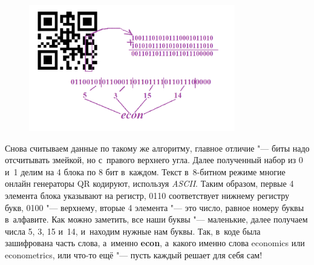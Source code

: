 \documentclass[final,pdftex]{../../template/epsilonj}
\begin{document}
\begin{figure}[htbp]
	\noindent
	\hfil
	\includegraphics[width=90mm]{41.png}
	\hfil
\end{figure}

Снова считываем данные по такому же алгоритму, главное отличие "--- биты надо отсчитывать змейкой, но с~правого верхнего угла. Далее полученный набор из 0 и~1 делим на 4 блока по 8 бит в~каждом. Текст в~8-битном режиме многие онлайн генераторы QR кодируют, используя {\it ASCII}. Таким образом, первые 4 элемента блока указывают на регистр, 0110 соответствует нижнему регистру букв, 0100 "--- верхнему, вторые 4 элемента "--- это число, равное номеру буквы в~алфавите. Как можно заметить, все наши буквы "--- маленькие, далее получаем числа 5, 3, 15 и~14, и~находим нужные нам буквы. Так, в~коде была зашифрована часть слова, а~именно {\bf econ}, а~какого именно слова economics или econometrics, или что-то ещё "--- пусть каждый решает для себя сам!
\end{document}

